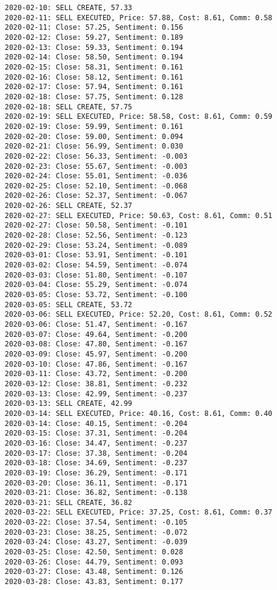 \documentclass[11pt]{article}
\begin{document}
\begin{Verbatim}[commandchars=\\\{\}]
2020-02-10: SELL CREATE, 57.33
2020-02-11: SELL EXECUTED, Price: 57.88, Cost: 8.61, Comm: 0.58
2020-02-11: Close: 57.25, Sentiment: 0.156
2020-02-12: Close: 59.27, Sentiment: 0.189
2020-02-13: Close: 59.33, Sentiment: 0.194
2020-02-14: Close: 58.50, Sentiment: 0.194
2020-02-15: Close: 58.31, Sentiment: 0.161
2020-02-16: Close: 58.12, Sentiment: 0.161
2020-02-17: Close: 57.94, Sentiment: 0.161
2020-02-18: Close: 57.75, Sentiment: 0.128
2020-02-18: SELL CREATE, 57.75
2020-02-19: SELL EXECUTED, Price: 58.58, Cost: 8.61, Comm: 0.59
2020-02-19: Close: 59.99, Sentiment: 0.161
2020-02-20: Close: 59.00, Sentiment: 0.094
2020-02-21: Close: 56.99, Sentiment: 0.030
2020-02-22: Close: 56.33, Sentiment: -0.003
2020-02-23: Close: 55.67, Sentiment: -0.003
2020-02-24: Close: 55.01, Sentiment: -0.036
2020-02-25: Close: 52.10, Sentiment: -0.068
2020-02-26: Close: 52.37, Sentiment: -0.067
2020-02-26: SELL CREATE, 52.37
2020-02-27: SELL EXECUTED, Price: 50.63, Cost: 8.61, Comm: 0.51
2020-02-27: Close: 50.58, Sentiment: -0.101
2020-02-28: Close: 52.56, Sentiment: -0.123
2020-02-29: Close: 53.24, Sentiment: -0.089
2020-03-01: Close: 53.91, Sentiment: -0.101
2020-03-02: Close: 54.59, Sentiment: -0.074
2020-03-03: Close: 51.80, Sentiment: -0.107
2020-03-04: Close: 55.29, Sentiment: -0.074
2020-03-05: Close: 53.72, Sentiment: -0.100
2020-03-05: SELL CREATE, 53.72
2020-03-06: SELL EXECUTED, Price: 52.20, Cost: 8.61, Comm: 0.52
2020-03-06: Close: 51.47, Sentiment: -0.167
2020-03-07: Close: 49.64, Sentiment: -0.200
2020-03-08: Close: 47.80, Sentiment: -0.167
2020-03-09: Close: 45.97, Sentiment: -0.200
2020-03-10: Close: 47.86, Sentiment: -0.167
2020-03-11: Close: 43.72, Sentiment: -0.200
2020-03-12: Close: 38.81, Sentiment: -0.232
2020-03-13: Close: 42.99, Sentiment: -0.237
2020-03-13: SELL CREATE, 42.99
2020-03-14: SELL EXECUTED, Price: 40.16, Cost: 8.61, Comm: 0.40
2020-03-14: Close: 40.15, Sentiment: -0.204
2020-03-15: Close: 37.31, Sentiment: -0.204
2020-03-16: Close: 34.47, Sentiment: -0.237
2020-03-17: Close: 37.38, Sentiment: -0.204
2020-03-18: Close: 34.69, Sentiment: -0.237
2020-03-19: Close: 36.29, Sentiment: -0.171
2020-03-20: Close: 36.11, Sentiment: -0.171
2020-03-21: Close: 36.82, Sentiment: -0.138
2020-03-21: SELL CREATE, 36.82
2020-03-22: SELL EXECUTED, Price: 37.25, Cost: 8.61, Comm: 0.37
2020-03-22: Close: 37.54, Sentiment: -0.105
2020-03-23: Close: 38.25, Sentiment: -0.072
2020-03-24: Close: 43.27, Sentiment: -0.039
2020-03-25: Close: 42.50, Sentiment: 0.028
2020-03-26: Close: 44.79, Sentiment: 0.093
2020-03-27: Close: 43.48, Sentiment: 0.126
2020-03-28: Close: 43.83, Sentiment: 0.177

\end{Verbatim}
\end{document}
